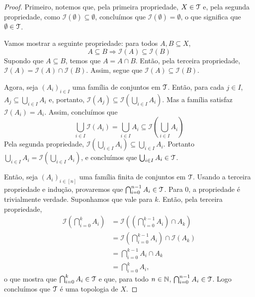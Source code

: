 \begin{proof}
	Primeiro, notemos que, pela primeira propriedade, $X \in \mathcal{T}$ e, pela segunda propriedade, como $\mathcal I(\emptyset) \subseteq \emptyset$, concluímos que $\mathcal I(\emptyset)=\emptyset$, o que significa que $\emptyset \in \mathcal{T}$. 	
	
	Vamos mostrar a seguinte propriedade: para todos $A,B \subseteq X$,
	\begin{equation*}
	A \subseteq B \Rightarrow \mathcal I(A) \subseteq \mathcal I(B)
	\end{equation*}
Supondo que $A \subseteq B$, temos que $A = A \cap B$. Então, pela terceira propriedade, $\mathcal I(A) = \mathcal I(A) \cap \mathcal I(B)$. Assim, segue que $\mathcal I(A) \subseteq \mathcal I(B)$.	
	
Agora, seja $(A_i)_{i \in I}$ uma família de conjuntos em $\mathcal{T}$. Então, para cada $j \in I$, $A_j \subseteq \bigcup_{i \in I} A_i$ e, portanto, $\mathcal I(A_j) \subseteq \mathcal I(\bigcup_{i \in I} A_i)$. Mas a família satisfaz $\mathcal I(A_i) = A_i$. Assim, concluímos que
	\begin{equation*}
	\bigcup_{i \in I} \mathcal I(A_i) = \bigcup_{i \in I} A_i \subseteq \mathcal I \left( \bigcup_{i \in I} A_i \right)
	\end{equation*}
Pela segunda propriedade, $\mathcal I(\bigcup_{i \in I} A_i) \subseteq \bigcup_{i \in I} A_i$. Portanto $\bigcup_{i \in I} A_i = \mathcal I(\bigcup_{i \in I} A_i )$, e concluímos que $\bigcup_{i \in I} A_i \in \mathcal{T}$.
	
	Então, seja $(A_i)_{i \in [n]}$ uma família finita de conjuntos em $\mathcal{T}$. Usando a terceira propriedade e indução, provaremos que $\bigcap_{i=0}^{n-1} A_i \in \mathcal{T}$. Para $0$, a propriedade é trivialmente verdade. Suponhamos que vale para $k$. Então, pela terceira propriedade,
	\begin{align*}
	\mathcal I \left( \bigcap_{i=0}^{k} A_i \right)
	&= \mathcal I \left( \left( \bigcap_{i=0}^{k-1} A_i \right) \cap A_{k} \right) \\
	&= \mathcal I \left( \bigcap_{i=0}^{k-1} A_i \right) \cap \mathcal I \left( A_{k} \right) \\
	&= \bigcap_{i=0}^{k-1} A_i \cap A_{k} \\
	&= \bigcap_{i=0}^{k} A_i,
	\end{align*}
o que mostra que $\bigcap_{i=0}^{k} A_i \in \mathcal{T}$ e que, para todo $n \in \mathbb{N}$, $\bigcap_{i=0}^{n-1} A_i \in \mathcal{T}$. Logo concluímos que $\mathcal{T}$ é uma topologia de $X$.


\end{proof}
